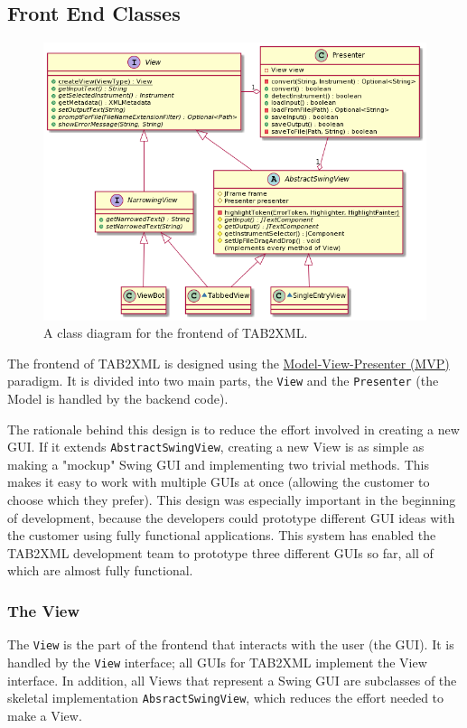 \documentclass[11pt]{article}
\begin{document}
\subsection{Front End Classes}
\label{sec:orgcd7c4b4}
\begin{figure}[htbp]
\centering
\includegraphics[width=.9\linewidth]{./Diagrams/frontend-class-diagram.png}
\caption{A class diagram for the frontend of TAB2XML.}
\end{figure}

The frontend of TAB2XML is designed using the \href{https://en.wikipedia.org/wiki/Model\%E2\%80\%93view\%E2\%80\%93presenter}{Model-View-Presenter (MVP)} paradigm.  It is divided into two main parts, the \texttt{View} and the \texttt{Presenter} (the Model is handled by the backend code).

The rationale behind this design is to reduce the effort involved in creating a new GUI.  If it extends \texttt{AbstractSwingView}, creating a new View is as simple as making a "mockup" Swing GUI and implementing two trivial methods.  This makes it easy to work with multiple GUIs at once (allowing the customer to choose which they prefer).  This design was especially important in the beginning of development, because the developers could prototype different GUI ideas with the customer using fully functional applications.  This system has enabled the TAB2XML development team to prototype three different GUIs so far, all of which are almost fully functional.
\subsubsection{The View}
\label{sec:org4b6a1bf}
The \texttt{View} is the part of the frontend that interacts with the user (the GUI).  It is handled by the \texttt{View} interface; all GUIs for TAB2XML implement the View interface.  In addition, all Views that represent a Swing GUI are subclasses of the skeletal implementation \texttt{AbsractSwingView}, which reduces the effort needed to make a View.
\end{document}
